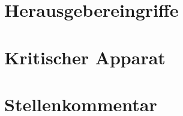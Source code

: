 \documentclass[twoside=true,titlepage=false,open=any, parskip=never, fontsize=10pt, headings=small, chapterprefix=false, appendixprefix=false]{scrbook}
\begin{document}
        \pend
    

        \endnumbering
        
        \section*{Herausgebereingriffe}
  
        \section*{Kritischer Apparat}
        
        \section*{Stellenkommentar}
        
        \printindex[person]
        \printindex[kw]
        


        
\end{document}
